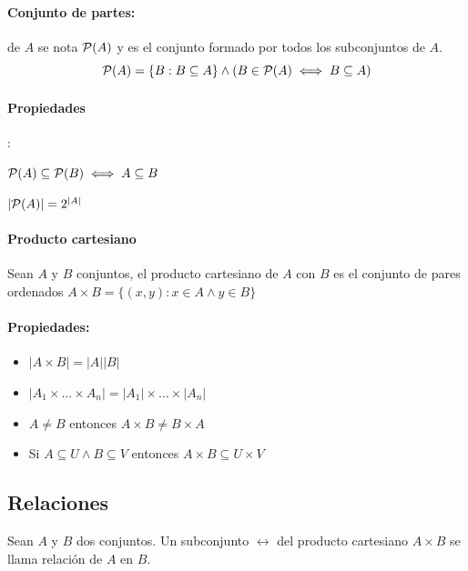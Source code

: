 \paragraph{Conjunto de partes:} de $A$ se nota $\mathcal{P}(A)$ y es el conjunto formado por todos los subconjuntos de $A$.
    \begin{equation*}
        \mathcal{P}(A) = \{B : B\subseteq A\}\land 
        (B\in \mathcal{P}(A)\iff B\subseteq A)
    \end{equation*}
    
\paragraph{Propiedades}:
    \begin{itemize}
    \begin{multicols}{2}
        \item $\mathcal{P}(A) \subseteq \mathcal{P}(B) \iff A\subseteq B$
        \item $|\mathcal{P}(A)| = 2^{|A|}$
    \end{multicols}
        
    \end{itemize}
    
\paragraph{Producto cartesiano} Sean $A$ y $B$ conjuntos, el producto cartesiano de $A$ con $B$ es el conjunto de pares ordenados $A\times B = \{(x,y) : x\in A \land y \in B\}$

\paragraph{Propiedades:}
    \begin{itemize}
        \item $|A\times B| = |A||B|$
        \item $|A_1\times\dots\times A_n| = |A_1|\times\dots\times|A_n|$ 
        \item $A\neq B$ entonces $A\times B \neq B\times A$
        \item Si $A\subseteq U \land B\subseteq V$ entonces $A\times B \subseteq U\times V$
    \end{itemize}
    


\subsection{Relaciones}
    Sean $A$ y $B$ dos conjuntos. Un subconjunto $\rel$ del producto cartesiano $A\times B$ se llama relación de $A$ en $B$.
    

